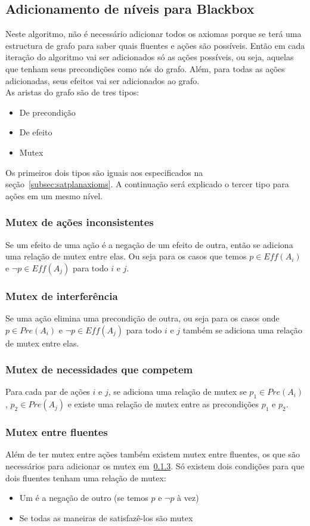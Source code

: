 \subsection{Adicionamento de níveis para Blackbox}
\label{subsec:blackboxaxioms}
	Neste algoritmo, não é necessário adicionar todos os axiomas porque se terá uma estructura de grafo para saber quais fluentes e ações são possíveis. Então em cada iteração do algoritmo vai ser adicionados só as ações possíveis, ou seja, aquelas que tenham seus precondições como nós do grafo. Além, para todas as ações adicionadas, seus efeitos vai ser adicionados ao grafo.\\
	As aristas do grafo são de tres tipos:
	\begin{itemize}
		\item De precondição
		\item De efeito
		\item Mutex
	\end{itemize}
	Os primeiros dois tipos são iguais aos especificados na seção~\ref{subsec:satplanaxioms}. A continuação será explicado o tercer tipo para ações em um mesmo nível.
	\subsubsection{Mutex de ações inconsistentes}
		Se um efeito de uma ação é a negação de um efeito de outra, então se adiciona uma relação de mutex entre elas. Ou seja para os casos que temos $p \in {Eff}( A_i )$ e $\lnot p \in {Eff}( A_j )$ para todo $i$ e $j$.
	
	\subsubsection{Mutex de interferência}
		Se uma ação elimina uma precondição de outra, ou seja para os casos onde $p \in {Pre}( A_i )$ e $\lnot p \in {Eff}( A_j )$ para todo $i$ e $j$ também se adiciona uma relação de mutex entre elas.
	
	\subsubsection{Mutex de necessidades que competem}
	\label{subsub:mutexcompetem}
		Para cada par de ações $i$ e $j$, se adiciona uma relação de mutex se $p_1 \in {Pre}( A_i )$, $p_2 \in {Pre}( A_j )$ e existe uma relação de mutex entre as precondições $p_1$ e $p_2$.
	
	\subsubsection{Mutex entre fluentes}
		Além de ter mutex entre ações também existem mutex entre fluentes, os que são necessários para adicionar os mutex em~\ref{subsub:mutexcompetem}. Só existem dois condições para que dois fluentes tenham uma relação de mutex:
		\begin{itemize}
			\item Um é a negação de outro (se temos $p$ e $\lnot p$ à vez)
			\item Se todas as maneiras de satisfazê-los são mutex
		\end{itemize}


